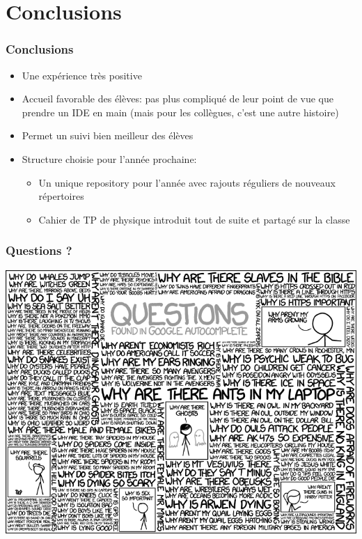 \section{Conclusions}

\begin{frame}
  \frametitle{Conclusions}


  \begin{itemize}[<+->]
      \item Une expérience très positive

      \item Accueil favorable des élèves: pas plus compliqué de leur point de vue que prendre un IDE en main (mais pour les collègues, c'est une autre histoire)

      \item Permet un suivi bien meilleur des élèves

      \item Structure choisie pour l'année prochaine:
        \begin{itemize}
            \item Un unique repository pour l'année avec rajouts réguliers de nouveaux répertoires

            \item Cahier de TP de physique introduit tout de suite et partagé sur la classe
        \end{itemize}

  \end{itemize}

\end{frame}

\begin{frame}
  \frametitle{Questions ?}

  \centering
  \includegraphics[width=0.8\linewidth]{figures/questions_xkcd}
\end{frame}
